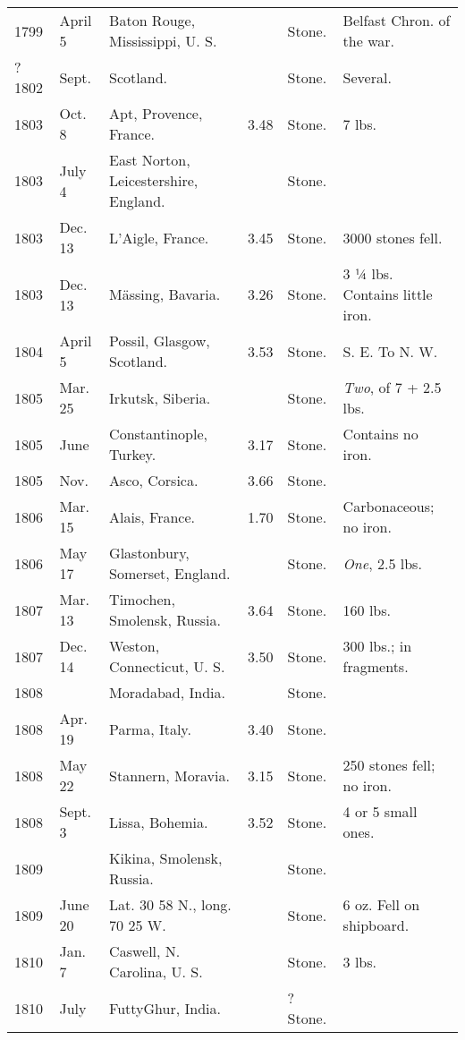 \documentclass[a4paper, 12pt, oneside]{article}
\begin{document}
\begin{center}
\begin{longtable}{|p{10mm}|p{15mm}|p{32mm}|p{13mm}|p{13mm}|p{26mm}|}
        1799 & April 5 & Baton Rouge, Mississippi, U. S. & ~ & Stone. & Belfast Chron. of the war. \\
        ? 1802 & Sept. & Scotland. & ~ & Stone. & Several. \\
        1803 & Oct. 8 & Apt, Provence, France. & 3.48 & Stone. & 7 lbs. \\
        1803 & July 4 & East Norton, Leicestershire, England. & ~ & Stone. & ~ \\
        1803 & Dec. 13 & L’Aigle, France. & 3.45 & Stone. & 3000 stones fell. \\
        1803 & Dec. 13 & Mässing, Bavaria. & 3.26 & Stone. & 3 ¼ lbs. Contains little iron. \\
        1804 & April 5 & Possil, Glasgow, Scotland. & 3.53 & Stone. & S. E. To N. W. \\
        1805 & Mar. 25 & Irkutsk, Siberia. & ~ & Stone. & \emph{Two}, of 7 + 2.5 lbs. \\
        1805 & June & Constantinople, Turkey. & 3.17 & Stone. & Contains no iron. \\
        1805 & Nov. & Asco, Corsica. & 3.66 & Stone. & ~ \\
        1806 & Mar. 15 & Alais, France. & 1.70 & Stone. & Carbonaceous; no iron. \\
        1806 & May 17 & Glastonbury, Somerset, England. & ~ & Stone. & \emph{One}, 2.5 lbs. \\
        1807 & Mar. 13 & Timochen, Smolensk, Russia. & 3.64 & Stone. & 160 lbs. \\
        1807 & Dec. 14 & Weston, Connecticut, U. S. & 3.50 & Stone. & 300 lbs.; in fragments. \\
        1808 & ~ & Moradabad, India. & ~ & Stone. & ~ \\
        1808 & Apr. 19 & Parma, Italy. & 3.40 & Stone. & ~ \\
        1808 & May 22 & Stannern, Moravia. & 3.15 & Stone. & 250 stones fell; no iron. \\
        1808 & Sept. 3 & Lissa, Bohemia. & 3.52 & Stone. & 4 or 5 small ones. \\
        1809 & ~ & Kikina, Smolensk, Russia. & ~ & Stone. & ~ \\
        1809 & June 20 & Lat. 30 58 N., long. 70 25 W. & ~ & Stone. & 6 oz. Fell on ship\-board. \\
        1810 & Jan. 7 & Caswell, N. Carolina, U. S. & ~ & Stone. & 3 lbs. \\
        1810 & July & Futty\-Ghur, India. & ~ & ? Stone. & ~ \\

\end{longtable}
\end{center}
\end{document}
